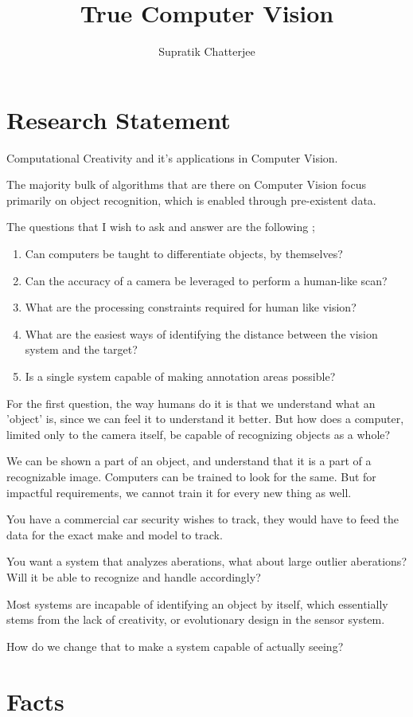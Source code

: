 \documentclass[a4paper, 12pt]{article}
\title{True Computer Vision}
\author{Supratik Chatterjee}
\begin{document}
\chapter{Research Statement}
Computational Creativity and it's applications in Computer Vision.

The majority bulk of algorithms that are there on Computer Vision focus primarily on object recognition, which is enabled through pre-existent data.

The questions that I wish to ask and answer are the following ; 

\begin{enumerate}
    \item Can computers be taught to differentiate objects, by themselves?
    \item Can the accuracy of a camera be leveraged to perform a human-like scan?
    \item What are the processing constraints required for human like vision?
    \item What are the easiest ways of identifying the distance between the vision system and the target?
    \item Is a single system capable of making annotation areas possible?
\end{enumerate}

For the first question, the way humans do it is that we understand what an 'object' is, 
since we can feel it to understand it better. But how does a computer, limited only to the camera itself,
be capable of recognizing objects as a whole?

We can be shown a part of an object, and understand that it is a part of a recognizable image.
Computers can be trained to look for the same. But for impactful requirements, we cannot train it for every new thing as well.

You have a commercial car security wishes to track, they would have to feed the data for the exact make and model to track.

You want a system that analyzes aberations, what about large outlier aberations?
Will it be able to recognize and handle accordingly?

Most systems are incapable of identifying an object by itself, which essentially stems from the lack of creativity, or 
evolutionary design in the sensor system.

How do we change that to make a system capable of actually seeing?

\chapter{Facts}
\end{document}
